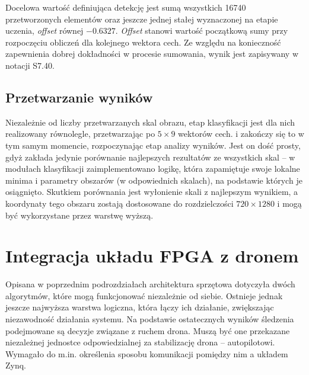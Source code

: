 Docelowa wartość definiująca detekcję jest sumą wszystkich 16740 przetworzonych elementów oraz jeszcze jednej stałej wyznaczonej na etapie uczenia, \textit{offset} równej $-0.6327$. 
\textit{Offset} stanowi wartość początkową sumy przy rozpoczęciu obliczeń dla kolejnego wektora cech. %
Ze względu na konieczność zapewnienia dobrej dokładności w procesie sumowania, wynik jest zapisywany w notacji S7.40.

\subsection{Przetwarzanie wyników}

Niezależnie od liczby przetwarzanych skal obrazu, etap klasyfikacji jest dla nich realizowany równolegle, przetwarzając po $5\times 9$ wektorów cech.  i zakończy się to w tym samym momencie, rozpoczynając etap analizy wyników. 
Jest on dość prosty, gdyż zakłada jedynie porównanie najlepszych rezultatów ze wszystkich skal -- w modułach klasyfikacji zaimplementowano logikę, która zapamiętuje swoje lokalne minima i parametry obszarów (w odpowiednich skalach), na podstawie których je osiągnięto. 
Skutkiem porównania jest wyłonienie skali z najlepszym wynikiem, a koordynaty tego obszaru zostają dostosowane do rozdzielczości $720 \times 1280$ i mogą być wykorzystane przez warstwę wyższą. %





\section{Integracja układu FPGA z dronem}

Opisana w poprzednim podrozdziałach architektura sprzętowa dotyczyła dwóch algorytmów, które mogą funkcjonować niezależnie od siebie. Ostnieje jednak jeszcze najwyższa warstwa logiczna, która łączy ich działanie, zwiększając niezawodność działania systemu. Na podstawie ostatecznych wyników śledzenia podejmowane są decyzje związane z ruchem drona. Muszą być one przekazane niezależnej jednostce odpowiedzialnej za stabilizację drona -- autopilotowi. Wymagało do m.in. określenia sposobu komunikacji pomiędzy nim a układem Zynq.


